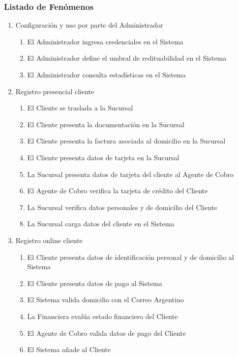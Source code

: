 \subsubsection{Listado de Fenómenos}
\begin{enumerate}
 \item Configuración y uso por parte del Administrador
  \begin{enumerate}
   \item El Administrador ingresa credenciales en el Sistema
   \item El Administrador define el umbral de redituabilidad en el Sistema
   \item El Administrador consulta estadísticas en el Sistema
  \end{enumerate}

 \item Registro presencial cliente
  \begin{enumerate}
      \item El Cliente se traslada a la Sucursal
      \item El Cliente presenta la documentación en la Sucursal
      \item El Cliente presenta la factura asociada al domicilio en la Sucursal
      \item El Cliente presenta datos de tarjeta en la Sucursal
      \item La Sucursal presenta datos de tarjeta del cliente al Agente de Cobro
      \item El Agente de Cobro verifica la tarjeta de crédito del Cliente
      \item La Sucursal verifica datos personales y de domicilio del Cliente
      \item La Sucursal carga datos del cliente en el Sistema
  \end{enumerate}
  
 \item Registro online cliente
  \begin{enumerate}
    \item El Cliente presenta datos de identificación personal y de domicilio al Sistema
    \item El Cliente presenta datos de pago al Sistema
    \item El Sistema valida domicilio con el Correo Argentino
    \item La Financiera evalúa estado financiero del Cliente
    \item El Agente de Cobro valida datos de pago del Cliente
    \item El Sistema añade al Cliente
  \end{enumerate}
  

\end{enumerate}
